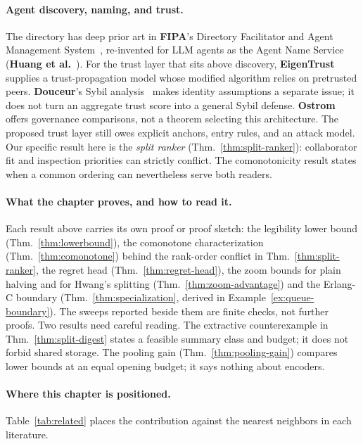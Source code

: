 \documentclass[11pt,a4paper]{article}
\theoremstyle{definition}
\theoremstyle{plain}
\begin{document}
\paragraph{Agent discovery, naming, and trust.}
The directory has deep prior art in \textbf{FIPA}'s Directory Facilitator
and Agent Management System~, re-invented for LLM agents as the Agent
Name Service (\textbf{Huang et al.}~). For the trust layer that sits above
discovery, \textbf{EigenTrust}~ supplies a trust-propagation
model whose modified algorithm relies on pretrusted peers. \textbf{Douceur}'s
Sybil analysis~ makes identity assumptions a separate issue;
it does not turn an aggregate trust score into a general Sybil defense.
\textbf{Ostrom}~ offers governance comparisons, not a theorem
selecting this architecture. The proposed trust layer still owes explicit
anchors, entry rules, and an attack model. Our specific result here is the \emph{split ranker}
(Thm.~\ref{thm:split-ranker}): collaborator fit and inspection priorities can
strictly conflict. The comonotonicity result states when a common ordering can
nevertheless serve both readers.

\paragraph{What the chapter proves, and how to read it.}
Each result above carries its own proof or proof sketch: the legibility lower
bound (Thm.~\ref{thm:lowerbound}), the comonotone characterization
(Thm.~\ref{thm:comonotone}) behind the rank-order conflict in
Thm.~\ref{thm:split-ranker}, the regret head (Thm.~\ref{thm:regret-head}), the
zoom bounds for plain halving and for Hwang's splitting
(Thm.~\ref{thm:zoom-advantage}) and the Erlang-C boundary
(Thm.~\ref{thm:specialization}, derived in Example~\ref{ex:queue-boundary}). The
sweeps reported beside them are finite checks, not further proofs. Two results
need careful reading. The extractive counterexample in
Thm.~\ref{thm:split-digest} states a feasible summary class and budget; it does
not forbid shared storage. The pooling gain (Thm.~\ref{thm:pooling-gain})
compares lower bounds at an equal opening budget; it says nothing about encoders.

\paragraph{Where this chapter is positioned.}
Table~\ref{tab:related} places the contribution against the nearest neighbors in each
literature.
\end{document}

